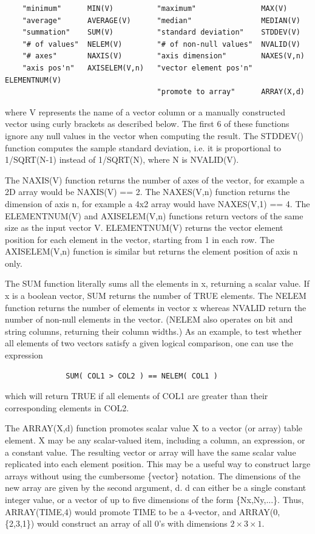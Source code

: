 \documentclass[11pt]{book}
\begin{document}
\begin{verbatim}
    "minimum"      MIN(V)          "maximum"               MAX(V)
    "average"      AVERAGE(V)      "median"                MEDIAN(V)
    "summation"    SUM(V)          "standard deviation"    STDDEV(V)
    "# of values"  NELEM(V)        "# of non-null values"  NVALID(V)
    "# axes"       NAXIS(V)        "axis dimension"        NAXES(V,n)
    "axis pos'n"   AXISELEM(V,n)   "vector element pos'n"  ELEMENTNUM(V)
                                   "promote to array"      ARRAY(X,d)
\end{verbatim}
    where V represents the name of a vector column or a manually
    constructed vector using curly brackets as described below.  The
    first 6 of these functions ignore any null values in the vector when
    computing the result.  The STDDEV() function computes the sample
    standard deviation, i.e. it is proportional to 1/SQRT(N-1) instead
    of 1/SQRT(N), where N is NVALID(V).

    The NAXIS(V) function returns the number of axes of the vector,
    for example a 2D array would be NAXIS(V) == 2.  The NAXES(V,n)
    function returns the dimension of axis n, for example a 4x2 array
    would have NAXES(V,1) == 4.  The ELEMENTNUM(V) and AXISELEM(V,n)
    functions return vectors of the same size as the input vector V.
    ELEMENTNUM(V) returns the vector element position for each element
    in the vector, starting from 1 in each row.  The AXISELEM(V,n)
    function is similar but returns the element position of axis n
    only.

    The SUM function literally sums all  the elements in x,  returning a
    scalar value.   If x  is  a  boolean  vector, SUM returns the number
    of TRUE elements. The NELEM function  returns the number of elements
    in vector x whereas NVALID return the number of non-null elements in
    the  vector.   (NELEM  also  operates  on  bit  and string  columns,
    returning their column widths.)  As an example, to  test whether all
    elements of two vectors satisfy a  given logical comparison, one can
    use the expression

\begin{verbatim}
              SUM( COL1 > COL2 ) == NELEM( COL1 )
\end{verbatim}

    which will return TRUE if all elements  of  COL1  are  greater  than
    their corresponding elements in COL2.

    The ARRAY(X,d) function promotes scalar value X to a vector (or
    array) table element.  X may be any scalar-valued item, including
    a column, an expression, or a constant value.  The resulting
    vector or array will have the same scalar value replicated into
    each element position.  This may be a useful way to construct
    large arrays without using the cumbersome \{vector\} notation. The
    dimensions of the new array are given by the second argument, d.
    d can either be a single constant integer value, or a vector of up
    to five dimensions of the form \{Nx,Ny,...\}.  Thus, ARRAY(TIME,4)
    would promote TIME to be a 4-vector, and ARRAY(0, \{2,3,1\}) would
    construct an array of all 0's with dimensions $2\times 3\times 1$.
\end{document}
